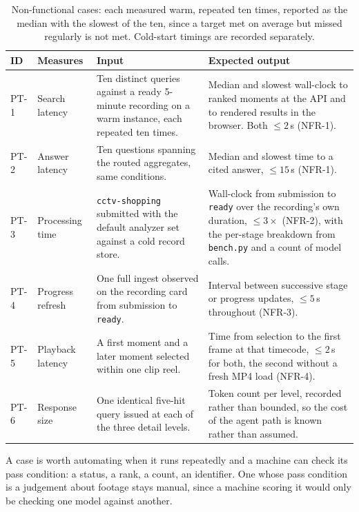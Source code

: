 \documentclass[11pt,a4paper]{article}
\begin{document}
\begin{table}[htbp]
\centering
\scriptsize
\begin{tabularx}{\textwidth}{@{}L{0.85cm}L{1.9cm}XX@{}}
\toprule
\textbf{ID} & \textbf{Measures} & \textbf{Input} & \textbf{Expected output} \\
\midrule
PT-1 & Search latency &
Ten distinct queries against a ready 5-minute recording on a warm instance, each repeated
ten times. &
Median and slowest wall-clock to ranked moments at the API and to rendered results in the
browser. Both $\leq 2$\,s (NFR-1). \\
PT-2 & Answer latency &
Ten questions spanning the routed aggregates, same conditions. &
Median and slowest time to a cited answer, $\leq 15$\,s (NFR-1). \\
PT-3 & Processing time &
\texttt{cctv-shopping} submitted with the default analyzer set against a cold record
store. &
Wall-clock from submission to \texttt{ready} over the recording's own duration, $\leq
3\times$ (NFR-2), with the per-stage breakdown from \texttt{bench.py} and a count of model
calls. \\
PT-4 & Progress refresh &
One full ingest observed on the recording card from submission to \texttt{ready}. &
Interval between successive stage or progress updates, $\leq 5$\,s throughout (NFR-3). \\
PT-5 & Playback latency &
A first moment and a later moment selected within one clip reel. &
Time from selection to the first frame at that timecode, $\leq 2$\,s for both, the second
without a fresh MP4 load (NFR-4). \\
PT-6 & Response size &
One identical five-hit query issued at each of the three detail levels. &
Token count per level, recorded rather than bounded, so the cost of the agent path is known
rather than assumed. \\
\bottomrule
\end{tabularx}
\caption{Non-functional cases: each measured warm, repeated ten times, reported as the
median with the slowest of the ten, since a target met on average but missed regularly is
not met. Cold-start timings are recorded separately.}
\end{table}

A case is worth automating when it runs repeatedly and a machine can check its pass
condition: a status, a rank, a count, an identifier. One whose pass condition is a
judgement about footage stays manual, since a machine scoring it would only be checking one
model against another.
\end{document}
